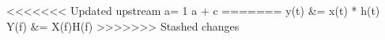 <<<<<<< Updated upstream
\int \cos a\theta = {1 \over a} \sin \theta + c
=======
y(t) &= x(t) * h(t) \\
Y(f) &= X(f)H(f)
>>>>>>> Stashed changes
